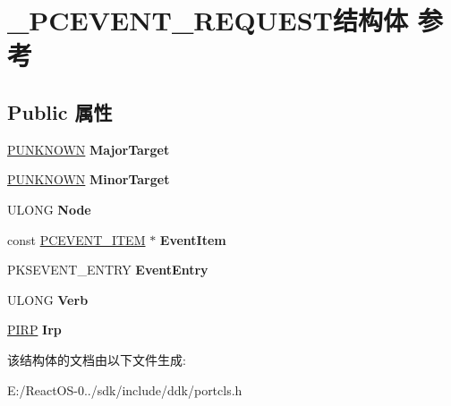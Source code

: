 \hypertarget{struct___p_c_e_v_e_n_t___r_e_q_u_e_s_t}{}\section{\+\_\+\+P\+C\+E\+V\+E\+N\+T\+\_\+\+R\+E\+Q\+U\+E\+S\+T结构体 参考}
\label{struct___p_c_e_v_e_n_t___r_e_q_u_e_s_t}
\subsection*{Public 属性}
\begin{DoxyCompactItemize}
\item 
\mbox{\label{struct___p_c_e_v_e_n_t___r_e_q_u_e_s_t_ab8324900ff8a9fe165e243e63d7a4bc5}} 
\hyperlink{interface_i_unknown}{P\+U\+N\+K\+N\+O\+WN} {\bfseries Major\+Target}
\item 
\mbox{\label{struct___p_c_e_v_e_n_t___r_e_q_u_e_s_t_a44b71ed3b5bd573d2043eb30bd83665f}} 
\hyperlink{interface_i_unknown}{P\+U\+N\+K\+N\+O\+WN} {\bfseries Minor\+Target}
\item 
\mbox{\label{struct___p_c_e_v_e_n_t___r_e_q_u_e_s_t_a54023203f19570d5bf6730d57942c71b}} 
U\+L\+O\+NG {\bfseries Node}
\item 
\mbox{\label{struct___p_c_e_v_e_n_t___r_e_q_u_e_s_t_a545aaed349c2a56ffbec09aeddc55dec}} 
const \hyperlink{struct___p_c_e_v_e_n_t___i_t_e_m}{P\+C\+E\+V\+E\+N\+T\+\_\+\+I\+T\+EM} $\ast$ {\bfseries Event\+Item}
\item 
\mbox{\label{struct___p_c_e_v_e_n_t___r_e_q_u_e_s_t_a31863a15f1255d07609be4732a5d5f27}} 
P\+K\+S\+E\+V\+E\+N\+T\+\_\+\+E\+N\+T\+RY {\bfseries Event\+Entry}
\item 
\mbox{\label{struct___p_c_e_v_e_n_t___r_e_q_u_e_s_t_a8eeeb36dd0999b94a6bd84a7d985a337}} 
U\+L\+O\+NG {\bfseries Verb}
\item 
\mbox{\label{struct___p_c_e_v_e_n_t___r_e_q_u_e_s_t_a369077492ee1e9cc415f1da2c5edd8f2}} 
\hyperlink{interfacevoid}{P\+I\+RP} {\bfseries Irp}
\end{DoxyCompactItemize}


该结构体的文档由以下文件生成\+:\begin{DoxyCompactItemize}
\item 
E\+:/\+React\+O\+S-\/0../sdk/include/ddk/portcls.\+h\end{DoxyCompactItemize}
